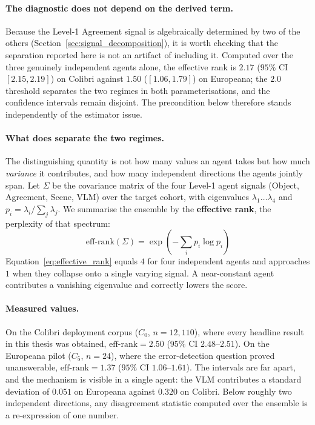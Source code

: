 \documentclass[12pt,a4paper]{report}
\begin{document}
\paragraph{The diagnostic does not depend on the derived term.} Because the Level-1 Agreement signal is algebraically determined by two of the others (Section~\ref{sec:signal_decomposition}), it is worth checking that the separation reported here is not an artifact of including it. Computed over the three genuinely independent agents alone, the effective rank is $2.17$ ($95\%$ CI $[2.15,2.19]$) on Colibri against $1.50$ ($[1.06,1.79]$) on Europeana; the $2.0$ threshold separates the two regimes in both parameterisations, and the confidence intervals remain disjoint. The precondition below therefore stands independently of the estimator issue.

\paragraph{What does separate the two regimes.} The distinguishing quantity is not how many values an agent takes but how much \emph{variance} it contributes, and how many independent directions the agents jointly span. Let $\Sigma$ be the covariance matrix of the four Level-1 agent signals (Object, Agreement, Scene, VLM) over the target cohort, with eigenvalues $\lambda_1 \dots \lambda_4$ and $p_i = \lambda_i / \sum_j \lambda_j$. We summarise the ensemble by the \textbf{effective rank}, the perplexity of that spectrum:
\begin{equation}
    \text{eff-rank}(\Sigma) = \exp\left(-\sum_{i} p_i \log p_i\right)
    \label{eq:effective_rank}
\end{equation}
Equation~\ref{eq:effective_rank} equals $4$ for four independent agents and approaches $1$ when they collapse onto a single varying signal. A near-constant agent contributes a vanishing eigenvalue and correctly lowers the score.

\paragraph{Measured values.} On the Colibri deployment corpus ($C_0$, $n=12{,}110$), where every headline result in this thesis was obtained, $\text{eff-rank}=2.50$ ($95\%$ CI $2.48$--$2.51$). On the Europeana pilot ($C_5$, $n=24$), where the error-detection question proved unanswerable, $\text{eff-rank}=1.37$ ($95\%$ CI $1.06$--$1.61$). The intervals are far apart, and the mechanism is visible in a single agent: the VLM contributes a standard deviation of $0.051$ on Europeana against $0.320$ on Colibri. Below roughly two independent directions, any disagreement statistic computed over the ensemble is a re-expression of one number.
\end{document}

